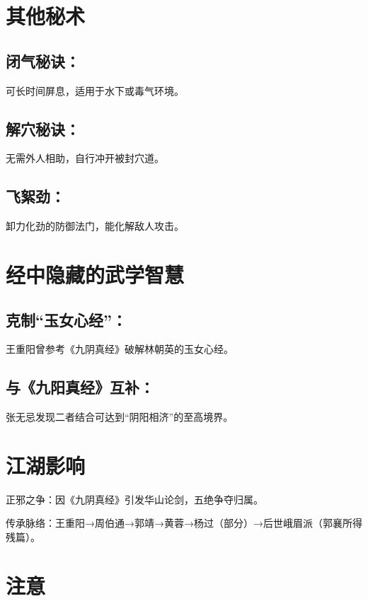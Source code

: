 \documentclass[doctor, vlined]{DissertUESTC}
\begin{document}
	\section{其他秘术}

	\subsection{闭气秘诀：}

	可长时间屏息，适用于水下或毒气环境。

	\subsection{解穴秘诀：}

	无需外人相助，自行冲开被封穴道。

	\subsection{飞絮劲：}

	卸力化劲的防御法门，能化解敌人攻击。

	\section{经中隐藏的武学智慧}

	\subsection{克制“玉女心经”：}

	王重阳曾参考《九阴真经》破解林朝英的玉女心经。

	\subsection{与《九阳真经》互补：}

	张无忌发现二者结合可达到“阴阳相济”的至高境界。

	\section{江湖影响}

	正邪之争：因《九阴真经》引发华山论剑，五绝争夺归属。

	传承脉络：王重阳→周伯通→郭靖→黄蓉→杨过（部分）→后世峨眉派（郭襄所得残篇）。

	\section{注意}
\end{document}
